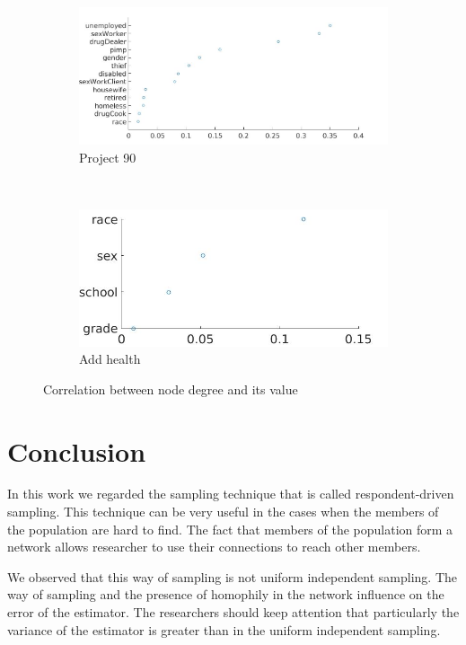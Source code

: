 \documentclass[12pt]{report}
\begin{document}
\begin{figure}[h]
\centering
    \begin{subfigure}[b]{0.6\textwidth}
        \includegraphics[width=\textwidth]{corrDegreePr90}
        \caption{ Project 90}

    \end{subfigure}
    ~
    \begin{subfigure}[b]{0.3\textwidth}
        \includegraphics[width=\textwidth]{corrDegreeStud}
        \caption{ Add health }

    \end{subfigure}
\label{fig:degree-val}
\caption{Correlation between node degree and its value}
\end{figure} 


\chapter*{Conclusion}


In this work we regarded the sampling technique that is called respondent-driven sampling. This technique can  be very useful in the cases when the members of the population are hard to find. The fact that members of the population form a network allows researcher to use their connections to reach other members.

We observed that this way of sampling is not uniform independent sampling. The way of sampling and the presence of homophily in the network influence on the error of the estimator. The researchers should keep attention that particularly the variance of the estimator is greater than in the uniform independent sampling.
\end{document}
